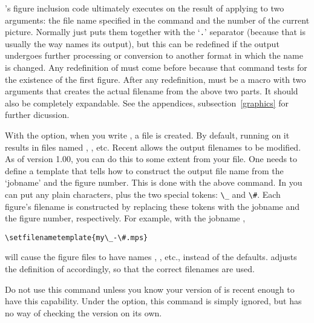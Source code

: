 \documentclass[letterpaper]{article}
\begin{document}
\Mfp's figure inclusion code ultimately executes
 on the result of applying  to two
arguments: the file name specified in the  command
and the number of the current picture. Normally  just
puts them together with the `\texttt{.}' separator (because that is
usually the way \MP{} names its output), but this can be redefined if
the \MP{} output undergoes further processing or conversion to another
format in which the name is changed. Any redefinition of
 must come before  because that
command tests for the existence of the first figure. After any
redefinition,  must be a macro with two arguments that
creates the actual filename from the above two parts. It should also be
completely expandable. See the appendices, subsection~\ref{graphics} for
further dicussion.

\begin{cd}
%
\end{cd}

With the  option, when you write
, a file  is created. By 
default, running \MP{} on it results in files named , 
, etc. Recent \MP{} allows the output filenames to be 
modified. As of \mfp{} version 1.00, you can do this to some extent from 
your  file. One needs to define a template that tells \MP{} 
how to construct the output file name from the `jobname' and the figure 
number. This is done with the above command. In  you can 
put any plain characters, plus the two special tokens: \verb$\_$ and 
\verb$\#$. Each figure's filename is constructed by replacing these 
tokens with the \MP{} jobname and the figure number, respectively. For 
example, with the jobname ,
\begin{verbatim}
\setfilenametemplate{my\_-\#.mps}
\end{verbatim}
will cause the figure files to have names ,
, etc., instead of the defaults. \Mfp{} adjusts the
definition of  accordingly, so that the correct
filenames are used.

Do not use this command unless you know your version of \MP{} is recent
enough to have this capability. Under the  option, this
command is simply ignored, but \mfp{} has no way of checking the \MP{}
version on its own.
\end{document}
